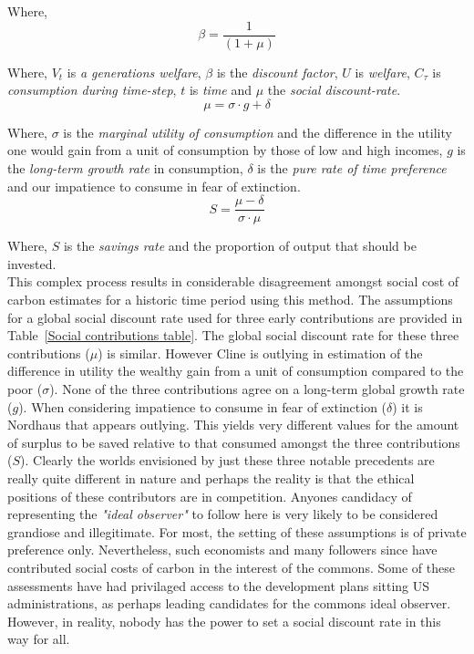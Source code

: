\documentclass[12pt, oneside]{article}   	%
\begin{document}
Where,
\begin{equation}
\beta = \frac{1}{(1+\mu)}
\end{equation}

Where, $V_t$ is \emph{a generations welfare}, $\beta$ is the \emph{discount factor}, $U$ is \emph{welfare}, $C_\tau$ is \emph{consumption during time-step}, $t$ is \emph{time} and $\mu$ the \emph{social discount-rate}.\\

\begin{equation}
\mu = \sigma \cdot g + \delta
\end{equation}

Where, $\sigma$ is the \emph{marginal utility of consumption} and the difference in the utility one would gain from a unit of consumption by those of low and high incomes, $g$ is the \emph{long-term growth rate} in consumption, $\delta$ is the \emph{pure rate of time preference} and our impatience to consume in fear of extinction.\\

\begin{equation}
S = \frac{\mu-\delta}{\sigma \cdot \mu}
\end{equation}

Where, $S$ is the \emph{savings rate} and the proportion of output that should be invested.\\

This complex process results in considerable disagreement amongst social cost of carbon estimates for a historic time period using this method.
The assumptions for a global social discount rate used for three early contributions are provided in Table~\ref{Social contributions table}.
The global social discount rate for these three contributions ($\mu$) is similar.
However Cline is outlying in estimation of the difference in utility the wealthy gain from a unit of consumption compared to the poor ($\sigma$).
None of the three contributions agree on a long-term global growth rate ($g$).
When considering impatience to consume in fear of extinction ($\delta$) it is Nordhaus that appears outlying.
This yields very different values for the amount of surplus to be saved relative to that consumed amongst the three contributions ($S$).
Clearly the worlds envisioned by just these three notable precedents are really quite different in nature and perhaps the reality is that the ethical positions of these contributors are in competition.
Anyones candidacy of representing the \emph{"ideal observer"} to follow here is very likely to be considered grandiose and illegitimate.
For most, the setting of these assumptions is of private preference only.
Nevertheless, such economists and many followers since have contributed social costs of carbon in the interest of the commons.
Some of these assessments have had privilaged access to the development plans sitting US administrations, as perhaps leading candidates for the commons ideal observer.
However, in reality, nobody has the power to set a social discount rate in this way for all.\\
\end{document}
